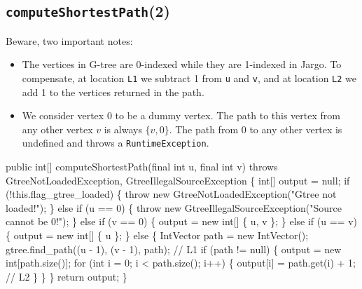 \documentclass{article}
\def\nwendcode{\endtrivlist \endgroup}      %
\let\nwdocspar=\par
\begin{document}
\subsection{{\tt{}\protect{}computeShortestPath}(2)}
Beware, two important notes:
\begin{itemize}
\item The vertices in G-tree are 0-indexed while they are 1-indexed in Jargo.  To
compensate, at location {\tt{}L1} we subtract 1 from {\tt{}u} and {\tt{}v}, and at
location {\tt{}L2} we add 1 to the vertices returned in the path.
\item We consider vertex 0 to be a dummy vertex. The path to this vertex
from any other vertex $v$ is always $\{v, 0\}$. The path from 0 to any other
vertex is undefined and throws a {\tt{}RuntimeException}.
\end{itemize}
\nwenddocs{}\endmoddef{}
public int[] computeShortestPath(final int u, final int v)
throws GtreeNotLoadedException, GtreeIllegalSourceException \{
  int[] output = null;
  if (!this.flag_gtree_loaded) \{
    throw new GtreeNotLoadedException("Gtree not loaded!");
  \} else if (u == 0) \{
    throw new GtreeIllegalSourceException("Source cannot be 0!");
  \} else if (v == 0) \{
    output = new int[] \{ u, v \};
  \} else if (u == v) \{
    output = new int[] \{ u \};
  \} else \{
    IntVector path = new IntVector();
    gtree.find_path((u - 1), (v - 1), path);        // L1
    if (path != null) \{
      output = new int[path.size()];
      for (int i = 0; i < path.size(); i++) \{
        output[i] = path.get(i) + 1;                // L2
      \}
    \}
  \}
  return output;
\}
\eatline
{}\nwendcode{}\nwdocspar
\end{document}
